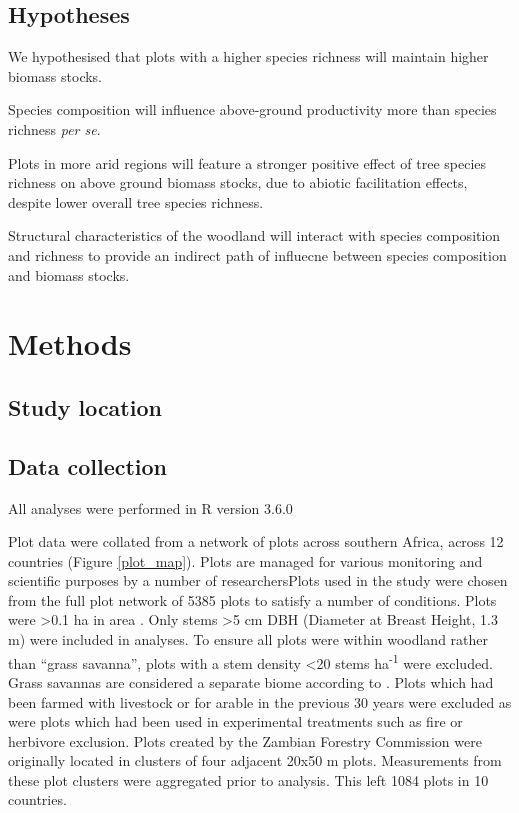 \documentclass[11pt,a4paper]{article}
\begin{document}
\subsection{Hypotheses}

We hypothesised that plots with a higher species richness will maintain higher biomass stocks.

Species composition will influence above-ground productivity more than species richness \textit{per se}. 

Plots in more arid regions will feature a stronger positive effect of tree species richness on above ground biomass stocks, due to abiotic facilitation effects, despite lower overall tree species richness.

Structural characteristics of the woodland will interact with species composition and richness to provide an indirect path of influecne between species composition and biomass stocks.


\section{Methods}

\subsection{Study location}

\subsection{Data collection}

All analyses were performed in R version 3.6.0

Plot data were collated from a network of plots across southern Africa, across 12 countries (Figure \ref{plot_map}). Plots are managed for various monitoring and scientific purposes by a number of researchersPlots used in the study were chosen from the full plot network of 5385 plots to satisfy a number of conditions. Plots were \textgreater{}0.1 ha in area . Only stems \textgreater{}5 cm DBH (Diameter at Breast Height, 1.3 m) were included in analyses. To ensure all plots were within woodland rather than ``grass savanna'', plots with a stem density \textless{}20 stems ha\textsuperscript{-1} were excluded. Grass savannas are considered a separate biome according to \citet{Parr2014} . Plots which had been farmed with livestock or for arable in the previous 30 years were excluded as were plots which had been used in experimental treatments such as fire or herbivore exclusion. Plots created by the Zambian Forestry Commission were originally located in clusters of four adjacent 20x50 m plots. Measurements from these plot clusters were aggregated prior to analysis. This left 1084 plots in 10 countries.
\end{document}
